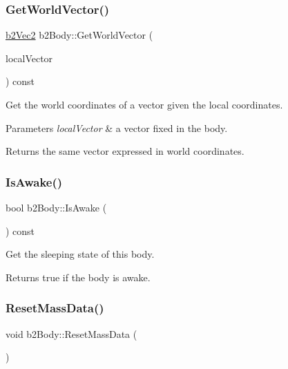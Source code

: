 \subsubsection{\texorpdfstring{Get\+World\+Vector()}{GetWorldVector()}}
{\footnotesize\ttfamily \hyperlink{structb2_vec2}{b2\+Vec2} b2\+Body\+::\+Get\+World\+Vector (\begin{DoxyParamCaption}\item[{const \hyperlink{structb2_vec2}{b2\+Vec2} \&}]{local\+Vector }\end{DoxyParamCaption}) const\hspace{0.3cm}{\ttfamily [inline]}}

Get the world coordinates of a vector given the local coordinates. 
\begin{DoxyParams}{Parameters}
{\em local\+Vector} & a vector fixed in the body. \\
\hline
\end{DoxyParams}
\begin{DoxyReturn}{Returns}
the same vector expressed in world coordinates. 
\end{DoxyReturn}
\mbox{\label{classb2_body_a697f708427cdf7d31a626e80e694682c}} 
\subsubsection{\texorpdfstring{Is\+Awake()}{IsAwake()}}
{\footnotesize\ttfamily bool b2\+Body\+::\+Is\+Awake (\begin{DoxyParamCaption}{ }\end{DoxyParamCaption}) const\hspace{0.3cm}{\ttfamily [inline]}}

Get the sleeping state of this body. \begin{DoxyReturn}{Returns}
true if the body is awake. 
\end{DoxyReturn}
\mbox{\label{classb2_body_a109d8567c6ae84c61fce2919fb209c63}} 
\subsubsection{\texorpdfstring{Reset\+Mass\+Data()}{ResetMassData()}}
{\footnotesize\ttfamily void b2\+Body\+::\+Reset\+Mass\+Data (\begin{DoxyParamCaption}{ }\end{DoxyParamCaption})}

